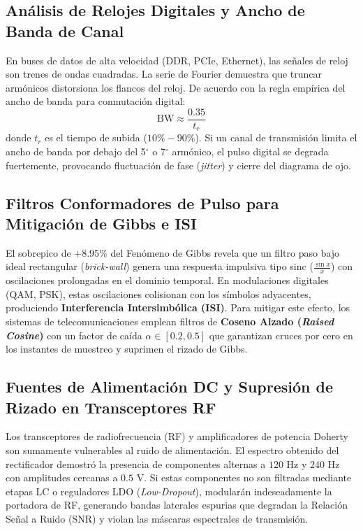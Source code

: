 \documentclass[11pt,a4paper]{article}
\begin{document}
\subsection{Análisis de Relojes Digitales y Ancho de Banda de Canal}
En buses de datos de alta velocidad (DDR, PCIe, Ethernet), las señales de reloj son trenes de ondas cuadradas. La serie de Fourier demuestra que truncar armónicos distorsiona los flancos del reloj. De acuerdo con la regla empírica del ancho de banda para conmutación digital:
\begin{equation}
    \text{BW} \approx \frac{0.35}{t_r}
\end{equation}
donde $t_r$ es el tiempo de subida ($10\% - 90\%$). Si un canal de transmisión limita el ancho de banda por debajo del 5$^\circ$ o 7$^\circ$ armónico, el pulso digital se degrada fuertemente, provocando fluctuación de fase (\textit{jitter}) y cierre del diagrama de ojo.

\subsection{Filtros Conformadores de Pulso para Mitigación de Gibbs e ISI}
El sobrepico de $+8.95\%$ del Fenómeno de Gibbs revela que un filtro paso bajo ideal rectangular (\textit{brick-wall}) genera una respuesta impulsiva tipo sinc ($\frac{\sin x}{x}$) con oscilaciones prolongadas en el dominio temporal. En modulaciones digitales (QAM, PSK), estas oscilaciones colisionan con los símbolos adyacentes, produciendo \textbf{Interferencia Intersimbólica (ISI)}. Para mitigar este efecto, los sistemas de telecomunicaciones emplean filtros de \textbf{Coseno Alzado (\textit{Raised Cosine})} con un factor de caída $\alpha \in [0.2, 0.5]$ que garantizan cruces por cero en los instantes de muestreo y suprimen el rizado de Gibbs.

\subsection{Fuentes de Alimentación DC y Supresión de Rizado en Transceptores RF}
Los transceptores de radiofrecuencia (RF) y amplificadores de potencia Doherty son sumamente vulnerables al ruido de alimentación. El espectro obtenido del rectificador demostró la presencia de componentes alternas a $120\text{ Hz}$ y $240\text{ Hz}$ con amplitudes cercanas a $0.5\text{ V}$. Si estas componentes no son filtradas mediante etapas LC o reguladores LDO (\textit{Low-Dropout}), modularán indeseadamente la portadora de RF, generando bandas laterales espurias que degradan la Relación Señal a Ruido (SNR) y violan las máscaras espectrales de transmisión.
\end{document}
